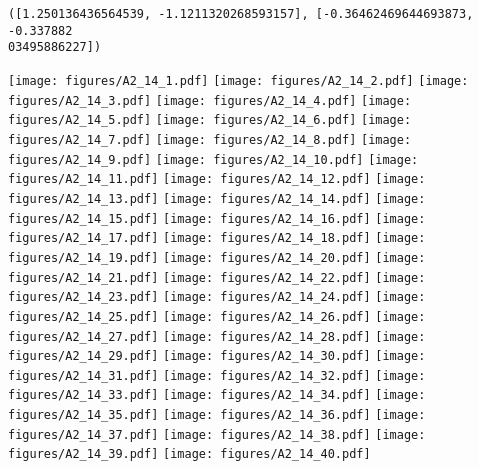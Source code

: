 \documentclass[12pt,a4paper]{article}
\begin{document}
\begin{lstlisting}
([1.250136436564539, -1.1211320268593157], [-0.36462469644693873, -0.337882
03495886227])
\end{lstlisting}

\texttt{[image: figures/A2\_14\_1.pdf]}
\texttt{[image: figures/A2\_14\_2.pdf]}
\texttt{[image: figures/A2\_14\_3.pdf]}
\texttt{[image: figures/A2\_14\_4.pdf]}
\texttt{[image: figures/A2\_14\_5.pdf]}
\texttt{[image: figures/A2\_14\_6.pdf]}
\texttt{[image: figures/A2\_14\_7.pdf]}
\texttt{[image: figures/A2\_14\_8.pdf]}
\texttt{[image: figures/A2\_14\_9.pdf]}
\texttt{[image: figures/A2\_14\_10.pdf]}
\texttt{[image: figures/A2\_14\_11.pdf]}
\texttt{[image: figures/A2\_14\_12.pdf]}
\texttt{[image: figures/A2\_14\_13.pdf]}
\texttt{[image: figures/A2\_14\_14.pdf]}
\texttt{[image: figures/A2\_14\_15.pdf]}
\texttt{[image: figures/A2\_14\_16.pdf]}
\texttt{[image: figures/A2\_14\_17.pdf]}
\texttt{[image: figures/A2\_14\_18.pdf]}
\texttt{[image: figures/A2\_14\_19.pdf]}
\texttt{[image: figures/A2\_14\_20.pdf]}
\texttt{[image: figures/A2\_14\_21.pdf]}
\texttt{[image: figures/A2\_14\_22.pdf]}
\texttt{[image: figures/A2\_14\_23.pdf]}
\texttt{[image: figures/A2\_14\_24.pdf]}
\texttt{[image: figures/A2\_14\_25.pdf]}
\texttt{[image: figures/A2\_14\_26.pdf]}
\texttt{[image: figures/A2\_14\_27.pdf]}
\texttt{[image: figures/A2\_14\_28.pdf]}
\texttt{[image: figures/A2\_14\_29.pdf]}
\texttt{[image: figures/A2\_14\_30.pdf]}
\texttt{[image: figures/A2\_14\_31.pdf]}
\texttt{[image: figures/A2\_14\_32.pdf]}
\texttt{[image: figures/A2\_14\_33.pdf]}
\texttt{[image: figures/A2\_14\_34.pdf]}
\texttt{[image: figures/A2\_14\_35.pdf]}
\texttt{[image: figures/A2\_14\_36.pdf]}
\texttt{[image: figures/A2\_14\_37.pdf]}
\texttt{[image: figures/A2\_14\_38.pdf]}
\texttt{[image: figures/A2\_14\_39.pdf]}
\texttt{[image: figures/A2\_14\_40.pdf]}
\end{document}
